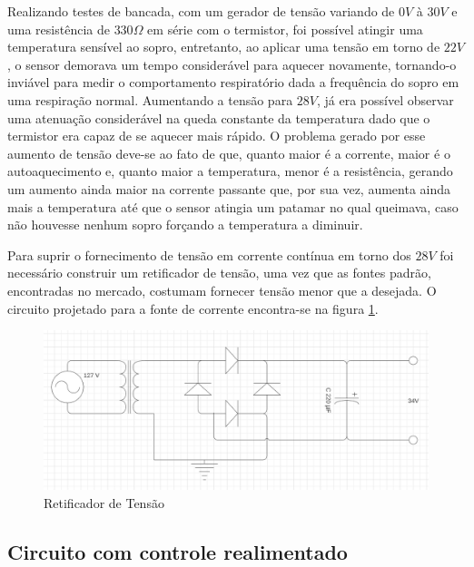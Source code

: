Realizando testes de bancada, com um gerador de tensão variando de $0V$ à $30V$ e uma resistência de $330\Omega$ em série com o termistor, foi possível atingir uma temperatura sensível ao sopro, entretanto, ao aplicar uma tensão em torno de $22V$, o sensor demorava um tempo considerável para aquecer novamente, tornando-o inviável para medir o comportamento respiratório dada a frequência do sopro em uma respiração normal. Aumentando a tensão para $28V$, já era possível observar uma atenuação considerável na queda constante da temperatura dado que o termistor era capaz de se aquecer mais rápido. O problema gerado por esse aumento de tensão deve-se ao fato de que, quanto maior é a corrente, maior é o autoaquecimento e, quanto maior a temperatura, menor é a resistência, gerando um aumento ainda maior na corrente passante que, por sua vez, aumenta ainda mais a temperatura até que o sensor atingia um patamar no qual queimava, caso não houvesse nenhum sopro forçando a temperatura a diminuir. 
 
Para suprir o fornecimento de tensão em corrente contínua em torno dos $28V$ foi necessário construir um retificador de tensão, uma vez que as fontes padrão, encontradas no mercado, costumam fornecer tensão menor que a desejada. O circuito projetado para a fonte de corrente encontra-se na figura \ref{fig:circuito_retificador}.

\begin{figure}[h!]
	\begin{center}
		\includegraphics[width=1\linewidth]{images/circuito_retificador.png}
		\caption{Retificador de Tensão}
		\label{fig:circuito_retificador}
	\end{center}
\end{figure} 
 
 
\subsection{Circuito com controle realimentado} 
 
